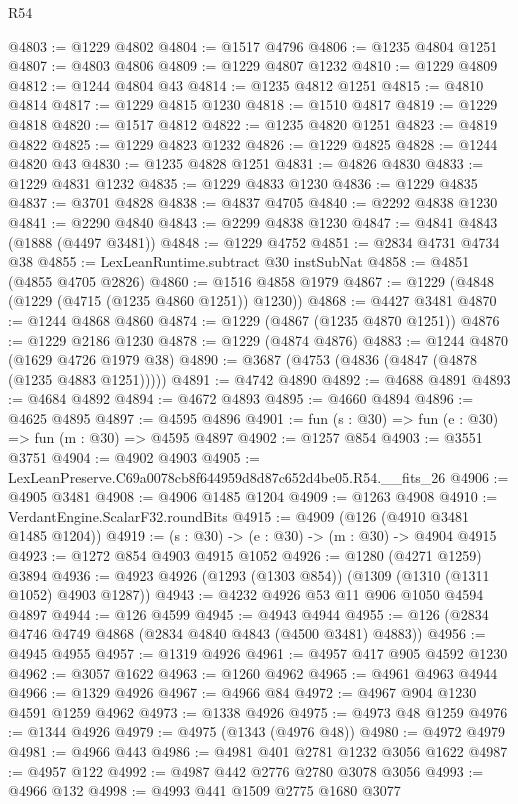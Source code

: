 \begin{lexlean}{R54}
\begin{coremodule}
@4803 := @1229 @4802
@4804 := @1517 @4796
@4806 := @1235 @4804 @1251
@4807 := @4803 @4806
@4809 := @1229 @4807 @1232
@4810 := @1229 @4809
@4812 := @1244 @4804 @43
@4814 := @1235 @4812 @1251
@4815 := @4810 @4814
@4817 := @1229 @4815 @1230
@4818 := @1510 @4817
@4819 := @1229 @4818
@4820 := @1517 @4812
@4822 := @1235 @4820 @1251
@4823 := @4819 @4822
@4825 := @1229 @4823 @1232
@4826 := @1229 @4825
@4828 := @1244 @4820 @43
@4830 := @1235 @4828 @1251
@4831 := @4826 @4830
@4833 := @1229 @4831 @1232
@4835 := @1229 @4833 @1230
@4836 := @1229 @4835
@4837 := @3701 @4828
@4838 := @4837 @4705
@4840 := @2292 @4838 @1230
@4841 := @2290 @4840
@4843 := @2299 @4838 @1230
@4847 := @4841 @4843 (@1888 (@4497 @3481))
@4848 := @1229 @4752
@4851 := @2834 @4731 @4734 @38
@4855 := LexLeanRuntime.subtract @30 instSubNat
@4858 := @4851 (@4855 @4705 @2826)
@4860 := @1516 @4858 @1979
@4867 := @1229 (@4848 (@1229 (@4715 (@1235 @4860 @1251)) @1230))
@4868 := @4427 @3481
@4870 := @1244 @4868 @4860
@4874 := @1229 (@4867 (@1235 @4870 @1251))
@4876 := @1229 @2186 @1230
@4878 := @1229 (@4874 @4876)
@4883 := @1244 @4870 (@1629 @4726 @1979 @38)
@4890 := @3687 (@4753 (@4836 (@4847 (@4878 (@1235 @4883 @1251)))))
@4891 := @4742 @4890
@4892 := @4688 @4891
@4893 := @4684 @4892
@4894 := @4672 @4893
@4895 := @4660 @4894
@4896 := @4625 @4895
@4897 := @4595 @4896
@4901 := fun (s : @30) => fun (e : @30) => fun (m : @30) => @4595 @4897
@4902 := @1257 @854
@4903 := @3551 @3751
@4904 := @4902 @4903
@4905 := LexLeanPreserve.C69a0078cb8f644959d8d87c652d4be05.R54.__fits_26
@4906 := @4905 @3481
@4908 := @4906 @1485 @1204
@4909 := @1263 @4908
@4910 := VerdantEngine.ScalarF32.roundBits
@4915 := @4909 (@126 (@4910 @3481 @1485 @1204))
@4919 := (s : @30) -> (e : @30) -> (m : @30) -> @4904 @4915
@4923 := @1272 @854 @4903 @4915 @1052
@4926 := @1280 (@4271 @1259) @3894
@4936 := @4923 @4926 (@1293 (@1303 @854)) (@1309 (@1310 (@1311 @1052) @4903 @1287))
@4943 := @4232 @4926 @53 @11 @906 @1050 @4594 @4897
@4944 := @126 @4599
@4945 := @4943 @4944
@4955 := @126 (@2834 @4746 @4749 @4868 (@2834 @4840 @4843 (@4500 @3481) @4883))
@4956 := @4945 @4955
@4957 := @1319 @4926
@4961 := @4957 @417 @905 @4592 @1230
@4962 := @3057 @1622
@4963 := @1260 @4962
@4965 := @4961 @4963 @4944
@4966 := @1329 @4926
@4967 := @4966 @84
@4972 := @4967 @904 @1230 @4591 @1259 @4962
@4973 := @1338 @4926
@4975 := @4973 @48 @1259
@4976 := @1344 @4926
@4979 := @4975 (@1343 (@4976 @48))
@4980 := @4972 @4979
@4981 := @4966 @443
@4986 := @4981 @401 @2781 @1232 @3056 @1622
@4987 := @4957 @122
@4992 := @4987 @442 @2776 @2780 @3078 @3056
@4993 := @4966 @132
@4998 := @4993 @441 @1509 @2775 @1680 @3077

\end{coremodule}
\end{lexlean}
